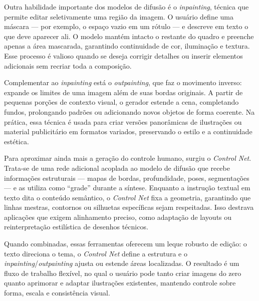 \documentclass[12pt, %
openright, 
oneside, %
a4paper,    %
brazil]{facom-ufu-abntex2}
\begin{document}
Outra habilidade importante dos modelos de difusão é o \emph{inpainting}, técnica que permite editar seletivamente uma região da imagem. O usuário define uma máscara — por exemplo, o espaço vazio em um rótulo — e descreve em texto o que deve aparecer ali. O modelo mantém intacto o restante do quadro e preenche apenas a área mascarada, garantindo continuidade de cor, iluminação e textura. Esse processo é valioso quando se deseja corrigir detalhes ou inserir elementos adicionais sem recriar toda a composição.

Complementar ao \emph{inpainting} está o \emph{outpainting}, que faz o movimento inverso: expande os limites de uma imagem além de suas bordas originais. A partir de pequenas porções de contexto visual, o gerador estende a cena, completando fundos, prolongando padrões ou adicionando novos objetos de forma coerente. Na prática, essa técnica é usada para criar versões panorâmicas de ilustrações ou material publicitário em formatos variados, preservando o estilo e a continuidade estética.

Para aproximar ainda mais a geração do controle humano, surgiu o \textit{Control Net}. Trata-se de uma rede adicional acoplada ao modelo de difusão que recebe informações estruturais — mapas de bordas, profundidade, poses, segmentações — e as utiliza como ``grade'' durante a síntese. Enquanto a instrução textual em texto dita o conteúdo semântico, o \textit{Control Net} fixa a geometria, garantindo que linhas mestras, contornos ou silhuetas específicas sejam respeitadas. Isso destrava aplicações que exigem alinhamento preciso, como adaptação de layouts ou reinterpretação estilística de desenhos técnicos.

Quando combinadas, essas ferramentas oferecem um leque robusto de edição: o texto direciona o tema, o \textit{Control Net} define a estrutura e o \emph{inpainting}/\emph{outpainting} ajusta ou estende áreas localizadas. O resultado é um fluxo de trabalho flexível, no qual o usuário pode tanto criar imagens do zero quanto aprimorar e adaptar ilustrações existentes, mantendo controle sobre forma, escala e consistência visual.
\end{document}
